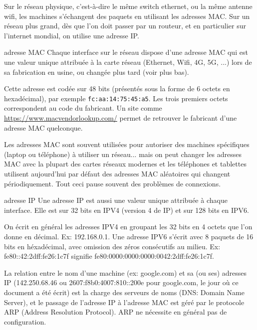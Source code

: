 \documentclass[a4paper,dvipsnames]{article}
\begin{document}
Sur le réseau physique, c'est-à-dire le même switch ethernet, ou la même antenne
wifi, les machines s'échangent
des paquets en utilisant les adresses MAC. Sur un réseau plus grand, dès que
l'on
doit passer par un routeur, et en particulier sur l'internet mondial, on utilise
une adresse IP.

\begin{definition}[breakable]{adresse MAC}{}
  Chaque interface sur le réseau dispose d'une adresse MAC qui est une valeur
  unique attribuée à la carte réseau (Ethernet, Wifi, 4G, 5G, ...) lors de sa
  fabrication en usine, ou changée plus tard (voir plus bas).

  \smallskip

  Cette adresse est codée sur 48 bits (présentés sous la forme de 6 octets en
  hexadécimal), par exemple \texttt{fc:aa:14:75:45:a5}. Les trois premiers
  octets correspondent au code du fabricant. Un site comme
  \url{https://www.macvendorlookup.com/} permet de retrouver le fabricant d'une
  adresse MAC quelconque.

  Les adresses MAC sont souvent utilisées pour autoriser des machines spécifiques
  (laptop ou téléphone) à utiliser un réseau... mais on peut changer les
  adresses MAC avec la plupart des cartes réseaux modernes et les téléphones et
  tablettes utilisent aujourd'hui par défaut des adresses MAC aléatoires qui
  changent périodiquement. Tout ceci pause souvent des problèmes de connexions.
\end{definition}

\begin{definition}[breakable]{adresse IP}{}
  Une adresse IP est aussi une valeur unique attribuée à chaque interface.  Elle
  est sur 32 bits en IPV4 (version 4 de IP) et sur 128 bits en IPV6.

  On écrit en général les adresses IPV4 en groupant les 32 bits en 4 octets que
  l'on donne en décimal. Ex: 192.168.0.1. Une adresse IPV6 s'écrit avec 8 paquets de
  16 bits en héxadécimal, avec omission des zéros consécutifs au milieu.
  Ex: fe80::42:2dff:fe26:1c7f signifie fe80:0000:0000:0000:0042:2dff:fe26:1c7f.

  La relation entre le nom d'une machine (ex: google.com) et sa (ou ses)
  adresses IP (142.250.68.46 ou 2607:f8b0:4007:810::200e pour google.com, le
  jour où ce document a été écrit)
  est la
  charge des serveurs de noms (DNS: Domain Name Server), et le passage de
  l'adresse IP à l'adresse MAC est géré par le protocole ARP (Address Resolution
  Protocol). ARP ne
  nécessite en général pas de configuration.
\end{definition}
\end{document}
